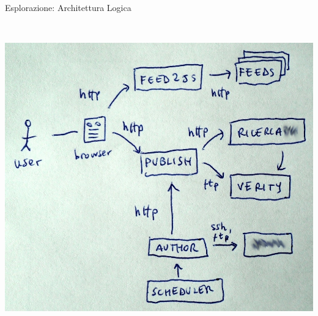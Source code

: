 \begin{frame}{Esplorazione: Architettura Logica}
\begin{columns}[T]
\begin{column}{.5\textwidth}
				\\ \vspace*{0.2cm}
				\hspace*{0.2cm} \includegraphics[scale=0.13]{images/architecture-4}
		    \end{column}
		 \end{columns}
	\end{frame}

